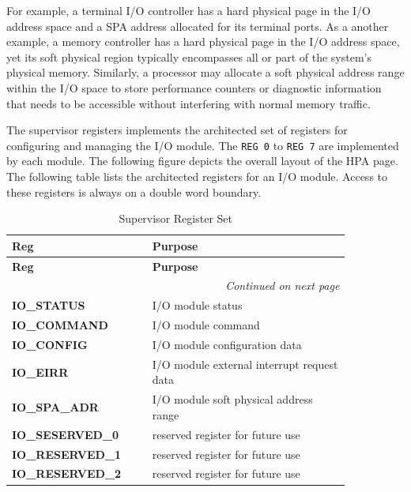 For example, a terminal I/O controller has a hard physical page in the I/O address space and a SPA address allocated for its terminal ports. As a another example, a memory controller has a hard physical page in the I/O address space, yet its soft physical region typically encompasses all or part of the system’s physical memory. Similarly, a processor may allocate a soft physical address range within the I/O space to store performance counters or diagnostic information that needs to be accessible without interfering with normal memory traffic.


The supervisor registers implements the architected set of registers for configuring and managing the I/O module. The \texttt{REG 0} to \texttt{REG 7} are implemented by each module. The following figure depicts the overall layout of the HPA page. The following table lists the architected registers for an I/O module. Access to these registers is always on a double word boundary.

\begin{longtable}{@{}p{0.35\linewidth}p{0.5\linewidth}@{}}
    \caption{Supervisor Register Set} \\
    \toprule
    \textbf{Reg} & \textbf{Purpose} \\
    \midrule
    \endfirsthead
    \toprule
    \textbf{Reg} & \textbf{Purpose} \\
    \midrule
    \endhead
    \midrule
    \multicolumn{2}{r}{\textit{Continued on next page}} \\
    \midrule
    \endfoot
    \bottomrule
    \endlastfoot
    \textbf{IO\_STATUS} & I/O module status \\
    \midrule
    \textbf{IO\_COMMAND} & I/O module command \\
    \midrule
    \textbf{IO\_CONFIG} & I/O module configuration data \\
    \midrule
    \textbf{IO\_EIRR} & I/O module external interrupt request data \\
    \midrule
    \textbf{IO\_SPA\_ADR} & I/O module soft physical address range \\
    \midrule
    \textbf{IO\_SESERVED\_0} & reserved register for future use \\
    \midrule
    \textbf{IO\_RESERVED\_1} & reserved register for future use\\
    \midrule
    \textbf{IO\_RESERVED\_2} & reserved register for future use\\
\end{longtable}

